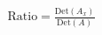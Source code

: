 \documentclass[preview]{standalone}
\begin{document}
\begin{align*}
\text{Ratio} = \frac{\text{Det}(A_x)}{\text{Det}(A)}
\end{align*}
\end{document}
